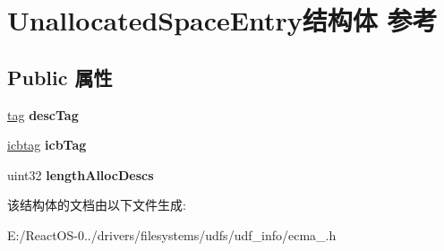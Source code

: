 \hypertarget{struct_unallocated_space_entry}{}\section{Unallocated\+Space\+Entry结构体 参考}
\label{struct_unallocated_space_entry}
\subsection*{Public 属性}
\begin{DoxyCompactItemize}
\item 
\mbox{\label{struct_unallocated_space_entry_aefd125cbc08d3f8fded452e013c8e51e}} 
\hyperlink{structtag}{tag} {\bfseries desc\+Tag}
\item 
\mbox{\label{struct_unallocated_space_entry_a14c2468fbc49429e822d254f6df5aa64}} 
\hyperlink{structicbtag}{icbtag} {\bfseries icb\+Tag}
\item 
\mbox{\label{struct_unallocated_space_entry_a45aaf383b67d912a6ceae75cec7c5911}} 
uint32 {\bfseries length\+Alloc\+Descs}
\end{DoxyCompactItemize}


该结构体的文档由以下文件生成\+:\begin{DoxyCompactItemize}
\item 
E\+:/\+React\+O\+S-\/0../drivers/filesystems/udfs/udf\+\_\+info/ecma\+\_.\+h\end{DoxyCompactItemize}
